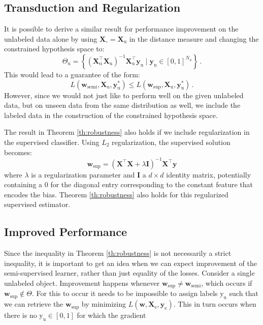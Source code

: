 \documentclass[sts,preprint]{imsart-custom}
\renewcommand{\vec}[1]{\mathbf{#1}}
\begin{document}
\subsection{Transduction and Regularization}
It is possible to derive a similar result for performance improvement on the unlabeled data alone by using $\vec{X}_\circ=\vec{X}_\text{u}$ in the distance measure and changing the constrained hypothesis space to:
\begin{equation}
\label{eq:constrainedregion2}
\Theta_\text{u} = \left\{ (\vec{X}_\mathrm{u}^\top \vec{X}_\mathrm{u})^{-1} \vec{X}_\mathrm{u}^\top \vec{y}_\mathrm{u} \mid \vec{y}_\text{u} \in [0,1]^{N_u} \right\}  \, . \nonumber
\end{equation}
This would lead to a guarantee of the form:
\begin{equation}
L(\vec{w}_\mathrm{semi},\vec{X}_\mathrm{u},\vec{y}_\mathrm{u}^{\ast}) \leq L(\vec{w}_\mathrm{sup},\vec{X}_\mathrm{u},\vec{y}_\mathrm{u}^{\ast})  \, . \nonumber
\end{equation}
However, since we would not just like to perform well on the given unlabeled data, but on unseen data from the same distribution as well, we include the labeled data in the construction of the constrained hypothesis space.

The result in Theorem \ref{th:robustness} also holds if we include regularization in the supervised classifier. Using $L_2$ regularization, the supervised solution becomes:
\begin{equation}
\label{eq:regsupervisedsolution}
\vec{w}_{\text{sup}} = (\vec{X}^\top \vec{X} + \lambda \vec{I})^{-1} \vec{X}^\top \vec{y} \nonumber
\end{equation}
where $\lambda$ is a regularization parameter and $\vec{I}$ a $d \times d$ identity matrix, potentially containing a $0$ for the diagonal entry corresponding to the constant feature that encodes the bias. Theorem \ref{th:robustness} also holds for this regularized supervised estimator.

\subsection{Improved Performance}
Since the inequality in Theorem \ref{th:robustness} is not necessarily a strict inequality, it is important to get an idea when we can expect improvement of the semi-supervised learner, rather than just equality of the losses. Consider a single unlabeled object. Improvement happens whenever $\vec{w}_\text{sup} \neq \vec{w}_\text{semi}$, which occurs if $\vec{w}_\text{sup} \notin \Theta$.  For this to occur it needs to be impossible to assign labels $\text{y}_\text{u}$ such that we can retrieve the $\vec{w}_\text{sup}$ by minimizing $L(\vec{w},\vec{X}_\text{e},\vec{y}_\text{e})$. This in turn occurs when there is no $\text{y}_\text{u} \in [0,1]$ for which the gradient
\end{document}
